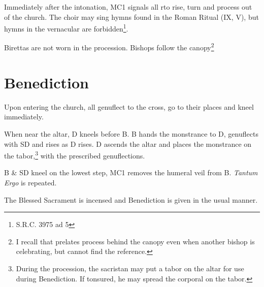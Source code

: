 \documentclass[letterpaper]{report}
\begin{document}
{\rubric Immediately after the intonation, MC1 signals all rto rise, turn and
process out of the church. The choir may sing hymns found in the Roman Ritual
(IX, V), but hymns in the vernacular are forbidden\footnote{S.R.C. 3975 ad 5}.

\rubric Birettas are not worn in the procession. Bishops follow the
canopy\footnote{I recall that prelates process behind the canopy even when
another bishop is celebrating, but cannot find the reference.}

\section{Benediction}

\rubric Upon entering the church, all genuflect to the cross, go to their
places and kneel immediately.

\rubric When near the altar, D kneels before B. B hands the monstrance to D,
genuflects with SD and rises as D rises. D ascends the altar and places the
monstrance on the tabor,\footnote{During the procession, the sacristan may put
    a tabor on the altar for use during Benediction. If tonsured, he may spread
    the corporal on the tabor.} with the prescribed genuflections.

\rubric B \& SD kneel on the lowest step, MC1 removes the humeral veil from
B. \textit{Tantum Ergo} is repeated.

\rubric The Blessed Sacrament is incensed and Benediction is given in the usual
manner.

}


\printbibliography
\end{document}
